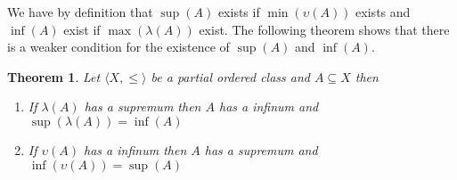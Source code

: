 \documentclass{book}
\newtheorem{theorem}{Theorem}
\begin{document}
We have by definition that $\sup (A)$ exists if $\min (\upsilon (A))$ exists
and $\inf (A)$ exist if $\max (\lambda (A))$ exist. The following theorem
shows that there is a weaker condition for the existence of $\sup (A)$ and
$\inf (A)$.

\begin{theorem}
  \label{order sup inf condition}Let $\langle X, \leqslant \rangle$ be a
  partial ordered class and $A \subseteq X$ then
  \begin{enumerate}
    \item If $\lambda (A)$ has a supremum then $A$ has a infinum and $\sup
    (\lambda (A)) = \inf (A)$
    
    \item If $\upsilon (A)$ has a infinum then $A$ has a supremum and $\inf
    (\upsilon (A)) = \sup (A)$
  \end{enumerate}
\end{theorem}
\end{document}
